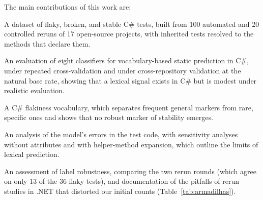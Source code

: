 The main contributions of this work are:
\begin{packed_itemize}
  \item[$\star$] A dataset of flaky, broken, and stable C\# tests, built from 100 automated and 20 controlled reruns of 17 open-source projects, with inherited tests resolved to the methods that declare them.
  \item[$\star$] An evaluation of eight classifiers for vocabulary-based static prediction in C\#, under repeated cross-validation and under cross-repository validation at the natural base rate, showing that a lexical signal exists in C\# but is modest under realistic evaluation.
  \item[$\star$] A C\# flakiness vocabulary, which separates frequent general markers from rare, specific ones and shows that no robust marker of stability emerges.
  \item[$\star$] An analysis of the model's errors in the test code, with sensitivity analyses without attributes and with helper-method expansion, which outline the limits of lexical prediction.
  \item[$\star$] An assessment of label robustness, comparing the two rerun rounds (which agree on only 13 of the 36 flaky tests), and documentation of the pitfalls of rerun studies in .NET that distorted our initial counts (Table~\ref{tab:armadilhas}).
\end{packed_itemize}
